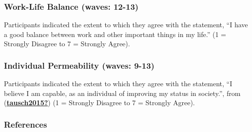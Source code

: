 \documentclass[
  singlecolumn]{report}
\begin{document}
\hypertarget{work-life-balance-waves-12-13}{%
\subsubsection{Work-Life Balance (waves:
12-13)}\label{work-life-balance-waves-12-13}}

Participants indicated the extent to which they agree with the
statement, ``I have a good balance between work and other important
things in my life.'' (1 = Strongly Disagree to 7 = Strongly Agree).

\hypertarget{individual-permeability-waves-9-13}{%
\subsubsection{Individual Permeability (waves:
9-13)}\label{individual-permeability-waves-9-13}}

Participants indicated the extent to which they agree with the
statement, ``I believe I am capable, as an individual of improving my
status in society.'', from
(\protect\hyperlink{ref-tausch2015}{\textbf{tausch2015?}}) (1 = Strongly
Disagree to 7 = Strongly Agree).

\pagebreak

\hypertarget{references}{%
\subsubsection{References}\label{references}}
\end{document}
